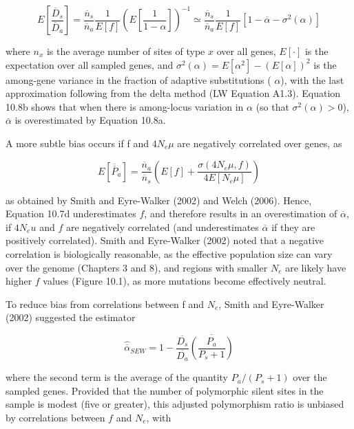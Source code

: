 \documentclass{article}
\begin{document}
\begin{equation}
E\left[\frac{\overline{D}_{s}}{\overline{D}_{a}}\right]=\frac{\overline{n}_{s}}{\overline{n}_{a}}\frac{1}{E[f]}\left(E\left[\frac{1}{1-\alpha}\right]\right)^{-1}\simeq\frac{\overline{n}_{s}}{\overline{n}_{a}}\frac{1}{E[f]}\left[1-\overline{\alpha}-\sigma^{2}(\alpha)\right]
\tag{10.8b}
\label{eq:10_8b}
\end{equation}

where  $ n_x $ is the average number of sites of type  $ x $ over all genes,  $ E[\cdot] $ is the expectation over all sampled genes, and  $ \sigma^2(\alpha) = E[\alpha^2] - (E[\alpha])^2 $ is the among-gene variance in the fraction of adaptive substitutions ( $ \alpha $), with the last approximation following from the delta method (LW Equation A1.3). Equation 10.8b shows that when there is among-locus variation in  $ \alpha $ (so that  $ \sigma^2(\alpha) > 0 $),  $ \overline{\alpha} $ is overestimated by Equation 10.8a.

A more subtle bias occurs if f and  $ 4N_{e}\mu $ are negatively correlated over genes, as

\begin{equation}
E\left[\overline{\overline{P}}_{a}\right]=\frac{\overline{n}_{a}}{\overline{n}_{s}}\left(E[f]+\frac{\sigma(4N_{e}\mu,f)}{4E[N_{e}\mu]}\right)
\tag{10.8c}
\label{eq:10_8c}
\end{equation}

as obtained by Smith and Eyre-Walker (2002) and Welch (2006). Hence, Equation 10.7d underestimates  $ f $, and therefore results in an overestimation of  $ \overline{\alpha} $, if  $ 4N_{e}u $ and  $ f $ are negatively correlated (and underestimates  $ \overline{\alpha} $ if they are positively correlated). Smith and Eyre-Walker (2002) noted that a negative correlation is biologically reasonable, as the effective population size can vary over the genome (Chapters 3 and 8), and regions with smaller  $ N_{e} $ are likely have higher  $ f $ values (Figure 10.1), as more mutations become effectively neutral.

To reduce bias from correlations between f and  $ N_{e} $, Smith and Eyre-Walker (2002) suggested the estimator

\begin{equation}
\widehat{\overline{\alpha}}_{SEW}=1-\frac{\overline{D_{s}}}{\overline{D_{a}}}\overline{\left(\frac{P_{a}}{P_{s}+1}\right)}
\tag{10.9a}
\label{eq:10_9a}
\end{equation}

where the second term is the average of the quantity  $ P_a/(P_s + 1) $ over the sampled genes. Provided that the number of polymorphic silent sites in the sample is modest (five or greater), this adjusted polymorphism ratio is unbiased by correlations between  $ f $ and  $ N_e $, with
\end{document}
